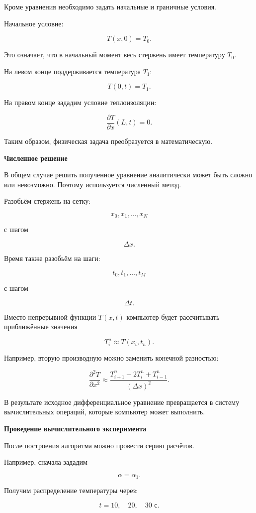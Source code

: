 Кроме уравнения необходимо задать начальные и граничные условия.

Начальное условие:

\[
T(x,0)=T_0.
\]

Это означает, что в начальный момент весь стержень имеет температуру
$T_0$.

На левом конце поддерживается температура $T_1$:

\[
T(0,t)=T_1.
\]

На правом конце зададим условие теплоизоляции:

\[
\frac{\partial T}{\partial x}(L,t)=0.
\]

Таким образом, физическая задача преобразуется в математическую.

\textbf{Численное решение}

В общем случае решить полученное уравнение аналитически может быть
сложно или невозможно. Поэтому используется численный метод.

Разобьём стержень на сетку:

\[
x_0,x_1,\ldots,x_N
\]

с шагом

\[
\Delta x.
\]

Время также разобьём на шаги:

\[
t_0,t_1,\ldots,t_M
\]

с шагом

\[
\Delta t.
\]

Вместо непрерывной функции $T(x,t)$ компьютер будет рассчитывать
приближённые значения

\[
T_i^n \approx T(x_i,t_n).
\]

Например, вторую производную можно заменить конечной разностью:

\[
\frac{\partial^2 T}{\partial x^2}
\approx
\frac{
	T_{i+1}^n
	-
	2T_i^n
	+
	T_{i-1}^n
}{
	(\Delta x)^2
}.
\]

В результате исходное дифференциальное уравнение превращается
в систему вычислительных операций, которые компьютер может выполнить.

\textbf{Проведение вычислительного эксперимента}

После построения алгоритма можно провести серию расчётов.

Например, сначала зададим

\[
\alpha=\alpha_1.
\]

Получим распределение температуры через:

\[
t=10,\quad 20,\quad 30\text{ с}.
\]

